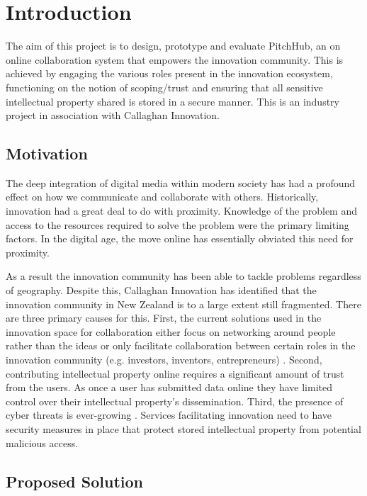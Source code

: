 \chapter{Introduction}
The aim of this project is to design, prototype and evaluate PitchHub, an on online collaboration system that empowers the innovation community. This is achieved by engaging the various roles present in the innovation ecosystem, functioning on the notion of scoping/trust and ensuring that all sensitive intellectual property shared is stored in a secure manner. This is an industry project in association with Callaghan Innovation.


\section{Motivation}
The deep integration of digital media within modern society has had a profound effect on how we communicate and collaborate with others. Historically, innovation had a great deal to do with proximity. Knowledge of the problem and access to the resources required to solve the problem were the primary limiting factors. In the digital age, the move online has essentially obviated this need for proximity. 

As a result the innovation community has been able to tackle problems regardless of geography. Despite this, Callaghan Innovation has identified that the innovation community in New Zealand is to a large extent still fragmented. There are three primary causes for this.
First, the current solutions used in the innovation space for collaboration either focus on networking around people rather than the ideas \cite{Linkedin:online}\cite{Googlegroups:online} or only facilitate collaboration between certain roles in the innovation community (e.g. investors, inventors, entrepreneurs) \cite{100open:online}\cite{Pledge:online}\cite{Angel:online}\cite{Quirky:online}. Second, contributing intellectual property online requires a significant amount of trust from the users. As once a user has submitted data online they have limited control over their intellectual property's dissemination. Third, the presence of cyber threats is ever-growing \cite{Cybersecurity:online}. Services facilitating innovation need to have security measures in place that protect stored intellectual property from potential malicious access.

\section{Proposed Solution}\label{S:projectObjectives}

